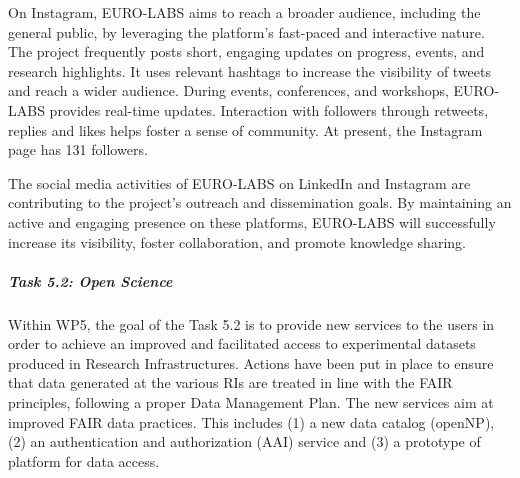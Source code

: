 On Instagram, EURO-LABS aims to reach a broader audience, including the general public, by leveraging the platform's fast-paced and interactive nature. The project frequently posts short, engaging updates on progress, events, and research highlights. It uses relevant hashtags to increase the visibility of tweets and reach a wider audience. During events, conferences, and workshops, EURO-LABS provides real-time updates. Interaction with followers through retweets, replies and likes helps foster a sense of community. At present, the Instagram page has 131 followers. 

The social media activities of EURO-LABS on LinkedIn and Instagram are contributing to the project's outreach and dissemination goals. By maintaining an active and engaging presence on these platforms, EURO-LABS will successfully increase its visibility, foster collaboration, and promote knowledge sharing. 





\subparagraph{Task 5.2: Open Science } \mbox{}

Within WP5, the goal of the Task 5.2 is to provide new services to the users in order to achieve an improved and facilitated access to experimental datasets produced in Research Infrastructures. 
Actions have been put in place to ensure that data generated at the various RIs are treated in line with the FAIR principles, following a proper Data Management Plan. 
The new services aim at improved FAIR data practices. This includes (1) a new data catalog (openNP), (2) an 
authentication and authorization (AAI) service and (3) a prototype of platform for data access.

